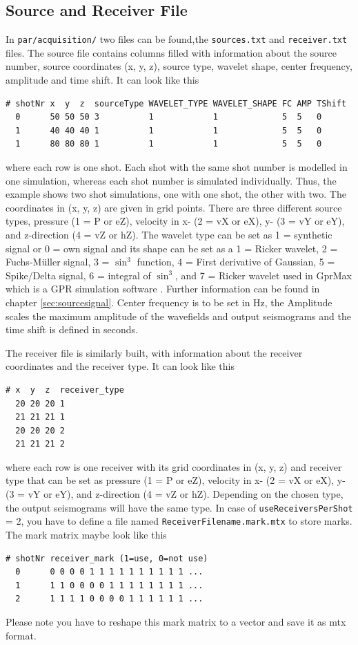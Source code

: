 \documentclass[pdftex,a4paper,parskip,listof=totoc,bibliography=totoc,onehalfspacing,12pt]{scrreprt}
\newcommand{\shellcmd}[1]{\indent\indent\texttt{#1}}	%
\begin{document}
\subsection{Source and Receiver File}\label{sec:sourcesandreceiver}
In \shellcmd{par/acquisition/} two files can be found,the \shellcmd{sources.txt} and \shellcmd{receiver.txt} files.
The source file contains columns filled with information about the source number, source coordinates (x, y, z), source type, wavelet shape, center frequency, amplitude and time shift. It can look like this
\begin{verbatim}
# shotNr x  y  z  sourceType WAVELET_TYPE WAVELET_SHAPE FC AMP TShift
  0      50 50 50 3          1            1             5  5   0
  1      40 40 40 1          1            1             5  5   0
  1      80 80 80 1          1            1             5  5   0
\end{verbatim}
where each row is one shot. Each shot with the same shot number is modelled in one simulation, whereas each shot number is simulated individually. Thus, the example shows two shot simulations, one with one shot, the other with two.
The coordinates in (x, y, z) are given in grid points. There are three different source types, pressure (1 = P or eZ), velocity in x- (2 = vX or eX), y- (3 = vY or eY), and z-direction (4 = vZ or hZ). 
The wavelet type can be set as 1 = synthetic signal or 0 = own signal and its shape can be set as a 1 = Ricker wavelet, 2 = Fuchs-M\"uller signal, 3 = $\sin^3$ function, 4 = First derivative of Gaussian, 5 = Spike/Delta signal, 6 = integral of $\sin^3$, and 7 = Ricker wavelet used in GprMax which is a GPR simulation software  \citep{giannopoulos2005modelling}. 
Further information can be found in chapter \ref{sec:sourcesignal}.
Center frequency is to be set in Hz, the Amplitude scales the maximum amplitude of the wavefields and output seismograms and the time shift is defined in seconds.

The receiver file is similarly built, with information about the receiver coordinates and the receiver type. It can look like this 
\begin{verbatim}
# x  y  z  receiver_type
  20 20 20 1
  21 21 21 1
  20 20 20 2
  21 21 21 2
\end{verbatim}
where each row is one receiver with its grid coordinates in (x, y, z) and receiver type that can be set as pressure (1 = P or eZ), velocity in x- (2 = vX or eX), y- (3 = vY or eY), and z-direction (4 = vZ or hZ). Depending on the chosen type, the output seismograms will have the same type. In case of \verb+useReceiversPerShot+ = 2, you have to define a file named \verb+ReceiverFilename.mark.mtx+ to store marks. The mark matrix maybe look like this
\begin{verbatim}
# shotNr receiver_mark (1=use, 0=not use)
  0      0 0 0 0 1 1 1 1 1 1 1 1 1 1 ...
  1      1 1 0 0 0 0 1 1 1 1 1 1 1 1 ...
  2      1 1 1 1 0 0 0 0 1 1 1 1 1 1 ...
\end{verbatim}
Please note you have to reshape this mark matrix to a vector and save it as mtx format.
\end{document}
